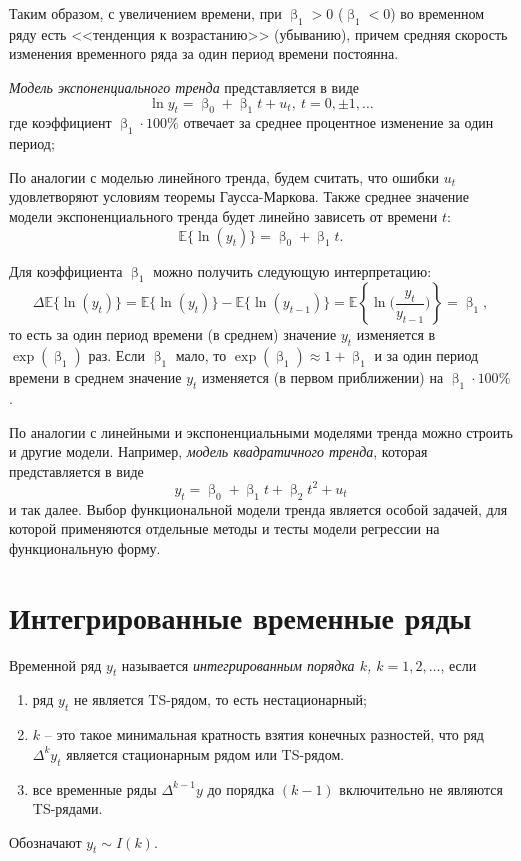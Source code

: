 \documentclass[a4paper, 14pt]{extreport}
\numberwithin{equation}{subsection}
\renewcommand{\beta}{\upbeta}
\newcommand{\E}{\mathbb E}
\numberwithin{equation}{section}
\begin{document}
	Таким образом, с увеличением времени, при $\beta_1> 0$ ($\beta_1 < 0$) во временном ряду есть <<тенденция к возрастанию>> (убыванию),
	причем средняя скорость изменения временного ряда за один период времени постоянна.
	
	\textit{Модель экспоненциального тренда} представляется в виде
	\begin{equation}
		\ln y_t=\beta_0+\beta_1t+u_t,\ t = 0, \pm 1,\ldots
	\end{equation}
	где коэффициент $\beta_1\cdot100\%$ отвечает за среднее процентное изменение за один период;
	
	По аналогии с моделью линейного тренда, будем считать, что ошибки $u_t$ удовлетворяют условиям теоремы Гаусса-Маркова.
	Также среднее значение модели экспоненциального тренда будет линейно зависеть от времени $t$:
	\begin{equation}
		\E \{\ln (y_t)\}=\beta_0+\beta_1t.
	\end{equation}
	
	Для коэффициента $\beta_1$ можно получить следующую интерпретацию:
	\begin{equation}
		\Delta \E\{\ln(y_t)\}=\E\{\ln(y_t)\}-\E\{\ln(y_{t-1})\}=\E\left\{\ln\bigg(\dfrac{y_t}{y_{t-1}}\bigg)\right\}=\beta_1,
	\end{equation}
	то есть за один период времени (в среднем) значение $y_t$ изменяется в $\exp(\beta_1)$ раз. Если $\beta_1$ мало, то $\exp(\beta_1)\approx1+\beta_1$ и за один период времени в среднем значение $y_t$ изменяется (в первом приближении) на $\beta_1\cdot100\%$.
	
	По аналогии с линейными и экспоненциальными моделями тренда можно строить и другие модели. Например, \textit{модель квадратичного тренда}, которая представляется в виде $$y_t=\beta_0+\beta_1t+\beta_2t^2+u_t$$
	и так далее.
	Выбор функциональной модели тренда является особой задачей, для которой применяются отдельные методы и тесты модели регрессии на функциональную форму.
	
	\section{Интегрированные временные ряды}
	Временной ряд $y_t$ называется \textit{интегрированным порядка $k$, $k=1,2,\ldots$}, если
	\begin{enumerate}
		\item ряд $y_t$ не является TS-рядом, то есть нестационарный;
		\item $k$ -- это такое минимальная кратность взятия конечных разностей, что ряд $\Delta^ky_t$ является стационарным рядом или TS-рядом.
		\item все временные ряды $\Delta ^{k-1}y$ до порядка $(k-1)$ включительно не являются TS-рядами.
	\end{enumerate}
	Обозначают $y_t \sim I(k)$.
	
\end{document}
